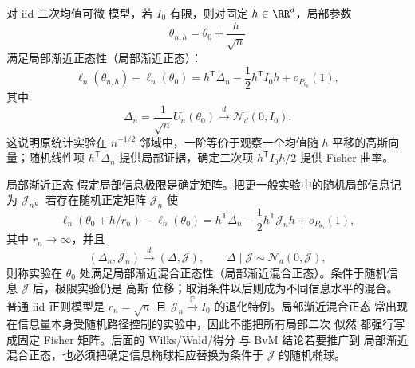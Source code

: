 \begin{theorem}
对 iid 二次均值可微 模型，若 $I_0$ 有限，则对固定 $h\in\RR^d$，局部参数
\[
 \theta_{n,h}=\theta_0+\frac{h}{\sqrt n}
\]
满足局部渐近正态性（局部渐近正态）：
\begin{equation}\label{eq:math-stat-lan-vector}
 \ell_n(\theta_{n,h})-\ell_n(\theta_0)
 =h^{\mathsf T}\Delta_n
 -\frac12h^{\mathsf T}I_0h
 +o_{P_{\theta_0}}(1),
\end{equation}
其中
\begin{equation}\label{eq:math-stat-score-clt}
 \Delta_n
 =\frac1{\sqrt n}U_n(\theta_0)
 \xrightarrow{d}\mathcal N_d(0,I_0).
\end{equation}
这说明原统计实验在 $n^{-1/2}$ 邻域中，一阶等价于观察一个均值随 $h$ 平移的高斯向量；随机线性项 $h^{\mathsf T}\Delta_n$ 提供局部证据，确定二次项 $h^{\mathsf T}I_0h/2$ 提供 Fisher 曲率。
\end{theorem}

\begin{definition}
局部渐近正态 假定局部信息极限是确定矩阵。把更一般实验中的随机局部信息记为 $\mathcal J_n$。若存在随机正定矩阵 $\mathcal J_n$ 使
\begin{equation*}\ell_n(\theta_0+h/r_n)-\ell_n(\theta_0)
 =h^{\mathsf T}\Delta_n
 -\frac12h^{\mathsf T}\mathcal J_nh
 +o_{P_{\theta_0}}(1),
\end{equation*}
其中 $r_n\to\infty$，并且
\[
 (\Delta_n,\mathcal J_n)\xrightarrow{d}(\Delta,\mathcal J),
 \qquad
 \Delta\mid\mathcal J\sim\mathcal N_d(0,\mathcal J),
\]
则称实验在 $\theta_0$ 处满足局部渐近混合正态性（局部渐近混合正态）。条件于随机信息 $\mathcal J$ 后，极限实验仍是 高斯 位移；取消条件以后则成为不同信息水平的混合。普通 iid 正则模型是 $r_n=\sqrt n$ 且 $\mathcal J_n\xrightarrow{\mathbb P} I_0$ 的退化特例。局部渐近混合正态 常出现在信息量本身受随机路径控制的实验中，因此不能把所有局部二次 似然 都强行写成固定 Fisher 矩阵。后面的 Wilks/Wald/得分 与 BvM 结论若要推广到 局部渐近混合正态，也必须把确定信息椭球相应替换为条件于 $\mathcal J$ 的随机椭球。
\end{definition}

